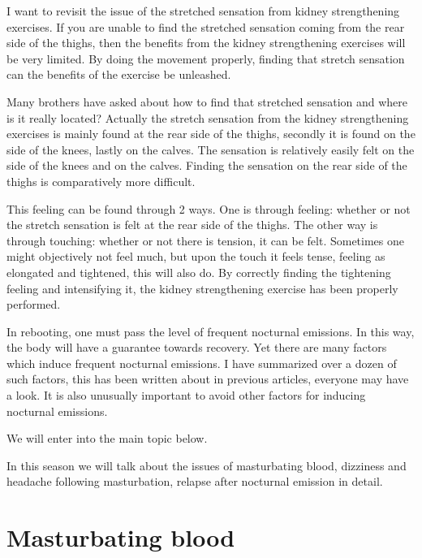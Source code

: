 \documentclass[
]{book}
\begin{document}
I want to revisit the issue of the stretched sensation from kidney strengthening exercises. If you are unable to find the stretched sensation coming from the rear side of the thighs, then the benefits from the kidney strengthening exercises will be very limited. By doing the movement properly, finding that stretch sensation can the benefits of the exercise be unleashed.

Many brothers have asked about how to find that stretched sensation and where is it really located? Actually the stretch sensation from the kidney strengthening exercises is mainly found at the rear side of the thighs, secondly it is found on the side of the knees, lastly on the calves. The sensation is relatively easily felt on the side of the knees and on the calves. Finding the sensation on the rear side of the thighs is comparatively more difficult.

This feeling can be found through 2 ways. One is through feeling: whether or not the stretch sensation is felt at the rear side of the thighs. The other way is through touching: whether or not there is tension, it can be felt. Sometimes one might objectively not feel much, but upon the touch it feels tense, feeling as elongated and tightened, this will also do. By correctly finding the tightening feeling and intensifying it, the kidney strengthening exercise has been properly performed.

In rebooting, one must pass the level of frequent nocturnal emissions. In this way, the body will have a guarantee towards recovery. Yet there are many factors which induce frequent nocturnal emissions. I have summarized over a dozen of such factors, this has been written about in previous articles, everyone may have a look. It is also unusually important to avoid other factors for inducing nocturnal emissions.

We will enter into the main topic below.

In this season we will talk about the issues of masturbating blood, dizziness and headache following masturbation, relapse after nocturnal emission in detail.

\hypertarget{masturbating-blood}{%
\section{Masturbating blood}\label{masturbating-blood}}
\end{document}
